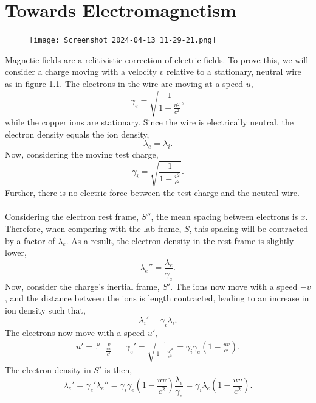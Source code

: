 \documentclass{book}
\begin{document}
\chapter{Towards Electromagnetism}
\begin{figure}
	\centering
	\texttt{[image: Screenshot\_2024-04-13\_11-29-21.png]}
	\caption{}
	\label{electromagetism}
\end{figure}
Magnetic fields are a relitivistic correction of electric fields. To prove this, we will consider a charge moving with a velocity $v$ relative to a stationary, neutral wire as in figure \ref{electromagetism}. The electrons in the wire are moving at a speed $u$,
\begin{equation}
	\gamma_e = \sqrt{\frac{1}{1 - \frac{u^2}{c^2}}},
\end{equation}
while the copper ions are stationary. Since the wire is electrically neutral, the electron density equals the ion density,
\begin{equation}
	\lambda_e = \lambda_i.
\end{equation}
Now, considering the moving test charge,
\begin{equation}
	\gamma_i = \sqrt{\frac{1}{1-\frac{v^2}{c^2}}}.
\end{equation}
Further, there is no electric force between the test charge and the neutral wire.
\\\\
Considering the electron rest frame, $S''$, the mean spacing between electrons is $x$. Therefore, when comparing with the lab frame, $S$, this spacing will be contracted by a factor of $\lambda_e$. As a result, the electron density in the rest frame is slightly lower,
\begin{equation}
	\lambda_e'' = \frac{\lambda_e}{\gamma_e}.
\end{equation}
Now, consider the charge's inertial frame, $S'$. The ions now move with a speed $-v$, and the distance between the ions is length contracted, leading to an increase in ion density such that,
\begin{equation}
	\lambda_i' = \gamma_i\lambda_i.
\end{equation} 
The electrons now move with a speed $u'$,
\begin{align}
	u' = \frac{u - v}{1 - \frac{uv}{c^2}} && \gamma_e' = \sqrt{\frac{1}{1-\frac{u'^2}{c^2}}} = \gamma_i\gamma_e\left(1 - \frac{uv}{c^2}\right).
\end{align}
The electron density in $S'$ is then,
\begin{equation}
	\lambda_e' = \gamma_e'\lambda_e'' = \gamma_i\gamma_e \left(1- \frac{uv}{c^2}\right)\frac{\lambda_e}{\gamma_e} = \gamma_i\lambda_e\left(1 - \frac{uv}{c^2}\right).
\end{equation}
\end{document}
